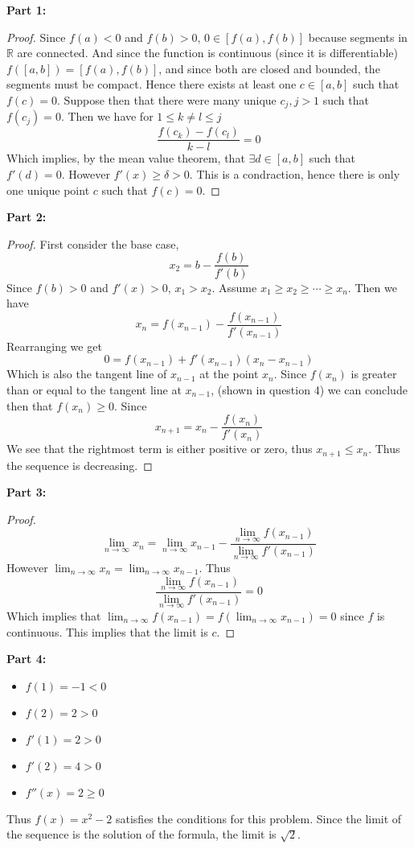 \documentclass[12pt, letterpaper]{article}
\begin{document}
\textbf{Part 1:}
\begin{proof}
  Since $f(a) < 0$ and $f(b) > 0$, $0\in[f(a),f(b)]$ because segments in $\mathbb R$ are connected. And since the function is continuous (since it is differentiable) $f([a,b]) = [f(a), f(b)]$, and since both are closed and bounded, the segments must be compact.
  Hence there exists at least one $c \in [a,b]$ such that $f(c)= 0$. Suppose then that there were many unique $c_j, j > 1$ such that $f(c_j) = 0$. Then we have for $1 \leq k \neq l \leq j$
  $$ \frac{f(c_k) - f(c_l)}{k - l} = 0 $$
  Which implies, by the mean value theorem, that $\exists d\in[a,b]$ such that $f'(d) = 0$. However $f'(x) \geq \delta>0$.
  This is a condraction, hence there is only one unique point $c$ such that $f(c)= 0$.
\end{proof}
\textbf{Part 2:}
\begin{proof}
  First consider the base case,
  $$ x_2 = b - \frac{f(b)}{f'(b)} $$
  Since $f(b) > 0$ and $f'(x) > 0$, $x_1 > x_2$. Assume $x_1 \geq x_2 \geq \cdots \geq x_n$. Then we have
  $$ x_{n} = f(x_{n-1}) - \frac{f(x_{n-1})}{f'(x_{n-1})} $$
  Rearranging we get
  $$ 0 = f(x_{n-1}) + f'(x_{n-1})(x_{n} - x_{n-1}) $$
  Which is also the tangent line of $x_{n-1}$ at the point $x_n$. Since $f(x_n)$ is greater than or equal to the tangent line at $x_{n-1}$, (shown in question 4)
  we can conclude then that $f(x_n) \geq 0$. Since
  $$x_{n+1} = x_n - \frac{f(x_n)}{f'(x_n)}$$
  We see that the rightmost term is either positive or zero, thus $x_{n+1} \leq x_n$. Thus the sequence is decreasing.
\end{proof}
\textbf{Part 3:}
\begin{proof}
  $$ \lim_{n \to \infty} x_n = \lim_{n \to \infty} x_{n-1} - \frac{\lim_{n \to \infty} f(x_{n-1})}{\lim_{n \to \infty}f'(x_{n-1})} $$
  However $\lim_{n \to \infty} x_n = \lim_{n \to \infty} x_{n-1}$. Thus
  $$ \frac{\lim_{n \to \infty} f(x_{n-1})}{\lim_{n \to \infty}f'(x_{n-1})} = 0 $$
  Which implies that $\lim_{n \to \infty} f(x_{n-1}) = f(\lim_{n \to \infty} x_{n-1}) = 0$ since $f$ is continuous. This implies that the limit is $c$.
\end{proof}
\textbf{Part 4:}
  \begin{itemize}
      \item $f(1) = -1 < 0$
      \item $f(2) = 2 > 0$
      \item $f'(1) = 2 > 0$
      \item $f'(2) = 4 > 0$
      \item $f''(x) = 2 \geq 0$
  \end{itemize}
  Thus $f(x)=x^2-2$ satisfies the conditions for this problem. Since the limit of the sequence is the solution of the formula, the limit is $\sqrt{2}$.
  \pagebreak
\end{document}
